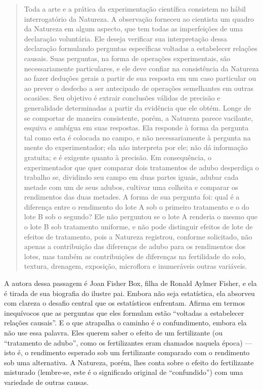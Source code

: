 \documentclass[11pt,a5paper,twoside]{book}
\begin{document}
\begin{quote}
Toda a arte e a prática da experimentação científica consistem no hábil interrogatório da Natureza. A observação forneceu ao cientista um quadro da Natureza em algum aspecto, que tem todas as imperfeições de uma declaração voluntária. Ele deseja verificar sua interpretação dessa declaração formulando perguntas específicas voltadas a estabelecer relações causais. Suas perguntas, na forma de operações experimentais, são necessariamente particulares, e ele deve confiar na consistência da Natureza ao fazer deduções gerais a partir de sua resposta em um caso particular ou ao prever o desfecho a ser antecipado de operações semelhantes em outras ocasiões. Seu objetivo é extrair conclusões válidas de precisão e generalidade determinadas a partir da evidência que ele obtém. Longe de se comportar de maneira consistente, porém, a Natureza parece vacilante, esquiva e ambígua em suas respostas. Ela responde à forma da pergunta tal como esta é colocada no campo, e não necessariamente à pergunta na mente do experimentador; ela não interpreta por ele; não dá informação gratuita; e é exigente quanto à precisão. Em consequência, o experimentador que quer comparar dois tratamentos de adubo desperdiça o trabalho se, dividindo seu campo em duas partes iguais, adubar cada metade com um de seus adubos, cultivar uma colheita e comparar os rendimentos das duas metades. A forma de sua pergunta foi: qual é a diferença entre o rendimento do lote A sob o primeiro tratamento e o do lote B sob o segundo? Ele não perguntou se o lote A renderia o mesmo que o lote B sob tratamento uniforme, e não pode distinguir efeitos de lote de efeitos de tratamento, pois a Natureza registrou, conforme solicitado, não apenas a contribuição das diferenças de adubo para os rendimentos dos lotes, mas também as contribuições de diferenças na fertilidade do solo, textura, drenagem, exposição, microflora e inumeráveis outras variáveis.
\end{quote}
A autora dessa passagem é Joan Fisher Box, filha de Ronald Aylmer Fisher, e ela é tirada de sua biografia do ilustre pai. Embora não seja estatística, ela absorveu com clareza o desafio central que os estatísticos enfrentam. Afirma em termos inequívocos que as perguntas que eles formulam estão “voltadas a estabelecer relações causais”. E o que atrapalha o caminho é o confundimento, embora ela não use essa palavra. Eles querem saber o efeito de um fertilizante (ou “tratamento de adubo”, como os fertilizantes eram chamados naquela época) — isto é, o rendimento esperado sob um fertilizante comparado com o rendimento sob uma alternativa. A Natureza, porém, lhes conta sobre o efeito do fertilizante misturado (lembre-se, este é o significado original de “confundido”) com uma variedade de outras causas.
\end{document}
